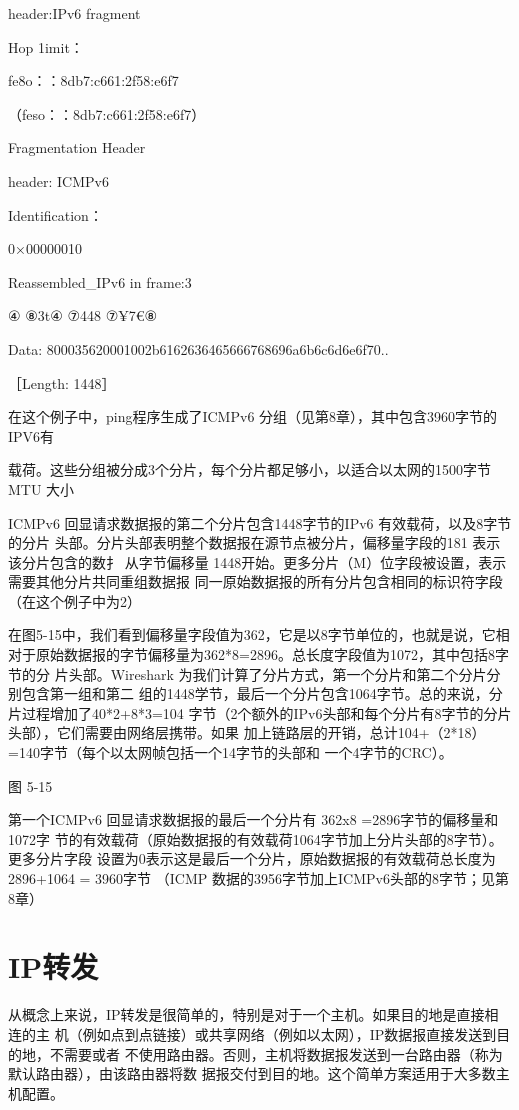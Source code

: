 header:IPv6 fragment

Hop 1imit：

fe8o：：8db7:c661:2f58:e6f7

（feso：：8db7:c661:2f58:e6f7）

Fragmentation Header

header: ICMPv6

Identification：

0×00000010

Reassembled\_IPv6 in frame:3

④ ⑧3t④ ⑦448 ⑦¥7€⑧

Data: 800035620001002b6162636465666768696a6b6c6d6e6f70..

［Length: 1448］

在这个例子中，ping程序生成了ICMPv6 分组（见第8章），其中包含3960字节的IPV6有

载荷。这些分组被分成3个分片，每个分片都足够小，以适合以太网的1500字节 MTU 大小


ICMPv6 回显请求数据报的第二个分片包含1448字节的IPv6 有效载荷，以及8字节的分片
头部。分片头部表明整个数据报在源节点被分片，偏移量字段的181 表示该分片包含的数扌
从字节偏移量 1448开始。更多分片（M）位字段被设置，表示需要其他分片共同重组数据报
同一原始数据报的所有分片包含相同的标识符字段（在这个例子中为2）

在图5-15中，我们看到偏移量字段值为362，它是以8字节单位的，也就是说，它相
对于原始数据报的字节偏移量为362*8=2896。总长度字段值为1072，其中包括8字节的分
片头部。Wireshark 为我们计算了分片方式，第一个分片和第二个分片分别包含第一组和第二
组的1448学节，最后一个分片包含1064字节。总的来说，分片过程增加了40*2+8*3=104
字节（2个额外的IPv6头部和每个分片有8字节的分片头部），它们需要由网络层携带。如果
加上链路层的开销，总计104+（2*18）=140字节（每个以太网帧包括一个14字节的头部和
一个4字节的CRC）。


图 5-15

第一个ICMPv6 回显请求数据报的最后一个分片有 362x8 =2896字节的偏移量和1072字
节的有效载荷（原始数据报的有效载荷1064字节加上分片头部的8字节）。更多分片字段
设置为0表示这是最后一个分片，原始数据报的有效载荷总长度为2896+1064 = 3960字节
（ICMP 数据的3956字节加上ICMPv6头部的8字节；见第8章）

\section{IP转发}

从概念上来说，IP转发是很简单的，特别是对于一个主机。如果目的地是直接相连的主
机（例如点到点链接）或共享网络（例如以太网），IP数据报直接发送到目的地，不需要或者
不使用路由器。否则，主机将数据报发送到一台路由器（称为默认路由器），由该路由器将数
据报交付到目的地。这个简单方案适用于大多数主机配置。

